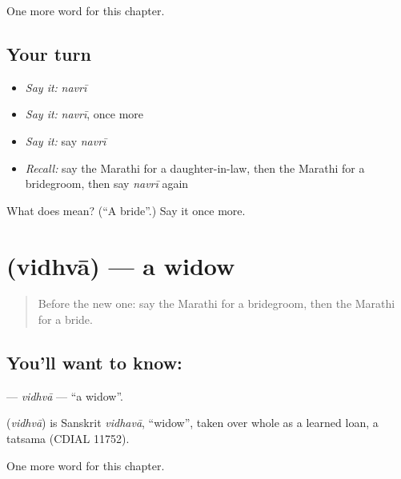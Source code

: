\begin{grammarlens}[title={What you've built}]
One more word for this chapter.
\end{grammarlens}

\subsection*{Your turn}
\begin{itemize}
\raggedright
  \item \emph{Say it:} \emph{navrī}
  \item \emph{Say it:} \emph{navrī}, once more
  \item \emph{Say it:} say \emph{navrī}
  \item \emph{Recall:} say the Marathi for a daughter-in-law, then the Marathi for a bridegroom, then say \emph{navrī} again
\end{itemize}

\begin{tcolorbox}[breakable,colback=teal!4,colframe=teal!35!black,title={Before you move on}]
What does  mean? (\textquotedblleft{}A bride\textquotedblright{}.) Say it once more.
\end{tcolorbox}
\section[\texorpdfstring{\mr{विधवा} (vidhvā)}{विधवा (vidhvā)}]{ (vidhvā) — a widow}

\label{lesson:MR-C181-vidhva}



\begin{quote}
Before the new one: say the Marathi for a bridegroom, then the Marathi for a bride.
\end{quote}

\subsection*{You'll want to know: }
\textbf{} — \emph{vidhvā} — \textquotedblleft{}a widow\textquotedblright{}.

\begin{cousinweb}
\textbf{} (\emph{vidhvā}) is Sanskrit \emph{vidhavā}, \textquotedblleft{}widow\textquotedblright{}, taken over whole as a learned loan, a tatsama (CDIAL 11752).
\end{cousinweb}

\begin{grammarlens}[title={What you've built}]
One more word for this chapter.
\end{grammarlens}

